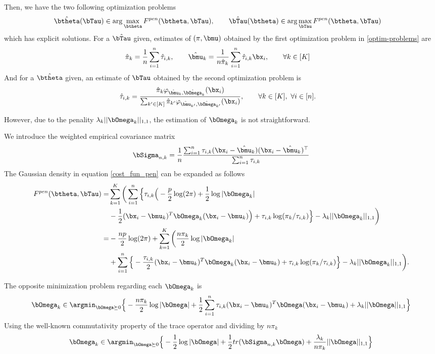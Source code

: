 Then, we have the two following optimization problems
\begin{align}
\label{optim-problems}
\hat\btheta(\bTau)&\in \arg\max_{\btheta} F^{pen}(\btheta,\bTau),\qquad \hat\bTau(\btheta)\in \arg\max_{\bTau} F^{pen}(\btheta,\bTau)
\end{align}
which has explicit solutions. For a $\hat\bTau$ given, estimates of $(\pi,\bmu)$ obtained by the first optimization problem in \ref{optim-problems} are
\begin{align}
\label{em-sols}
\hat\pi_k     &= \frac1n\sum_{i=1}^n \hat\tau_{i,k},\qquad\hat\bmu_k = \frac1{n\hat\pi_k}\sum_{i=1}^n \hat\tau_{i,k}\bx_i ,\qquad \forall k\in[K]
\end{align}
And for a $\hat\btheta$ given, an estimate of $\bTau$ obtained by the second optimization problem is
\begin{align}
\label{em-sols-tau}
\hat\tau_{i,k}&= \frac{\hat\pi_k\varphi_{\hat\bmu_k,\hat\bOmega_k}(\bx_i)}{\sum_{k'\in[K]}\hat\pi_{k'}\varphi_{\hat\bmu_{k'},\hat\bOmega_{k'}}(\bx_i)},\qquad\forall k\in[K],\ \forall i\in[n].
\end{align}

However, due to the penality $\lambda_k||\bOmega_k||_{1,1}$, the estimation of $\bOmega_k$ is not straightforward.

We introduce the weighted empirical covariance matrix
\begin{equation}
\bSigma_{n,k} = \frac{1}{n}\frac{\sum_{i=1}^n\tau_{i,k}(\bx_i-\hat\bmu_k)(\bx_i-\hat\bmu_k)^\top}{\sum_{i=1}^n\tau_{i,k}}
\end{equation}
The Gaussian density in equation \eqref{cost_fun_pen} can be expanded as follows
\begin{align*}
\label{cost_fun_pen_2}
F^{pen}(\btheta,\bTau)  =& \sum_{k=1}^K \bigg( \sum_{i=1}^{n}\Big\{ \tau_{i,k} \Big(
-\frac{p}{2}\log(2\pi)+\frac{1}{2}\log|\bOmega_k|\\
&-\frac{1}{2}(\bx_i-\bmu_k)^T\bOmega_k(\bx_i-\bmu_k) \Big)+\tau_{i,k} \log(\pi_k/\tau_{i,k})\Big\} -\lambda_k||\bOmega_k||_{1,1}\bigg)\\
=& -\frac{np}{2}\log(2\pi)+\sum_{k=1}^K \bigg(\frac{n\pi_k}{2}\log|\bOmega_k|\\
&+\sum_{i=1}^{n}\Big\{ -\frac{\tau_{i,k}}{2}(\bx_i-\bmu_k)^T\bOmega_k(\bx_i-\bmu_k)+\tau_{i,k} \log(\pi_k/\tau_{i,k})\Big\} -\lambda_k||\bOmega_k||_{1,1}\bigg). 
\end{align*}

The opposite minimization problem regarding each $\bOmega_k$ is
\begin{equation}
\bOmega_k \in \argmin_{ \bOmega\succeq 0}\Big\{-\frac{n\pi_k}{2}\log|\bOmega|+\frac{1}{2}\sum_{i=1}^{n}\tau_{i,k}(\bx_i-\bmu_k)^T\bOmega(\bx_i-\bmu_k)+\lambda_k||\bOmega||_{1,1}\Big\}
\end{equation}
Using the well-known commutativity property of the trace operator and dividing by $n\pi_k$
\begin{equation}
\bOmega_k \in \argmin_{ \bOmega\succeq 0} \Big\{ -\frac{1}{2}\log|\bOmega| +\frac{1}{2} tr(\bSigma_{n,k}\bOmega)+\frac{\lambda_k}{n\pi_k}||\bOmega||_{1,1}\Big\}
\end{equation}

